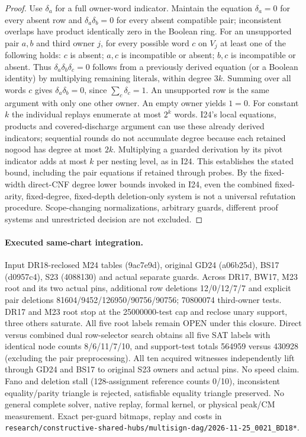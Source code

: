 \documentclass[11pt]{article}
\begin{document}
\begin{proof}
Use $\delta_a$ for a full owner-word indicator. Maintain the equation $\delta_a=0$ for every absent row and $\delta_a\delta_b=0$ for every absent compatible pair; inconsistent overlaps have product identically zero in the Boolean ring. For an unsupported pair $a,b$ and third owner $j$, for every possible word $c$ on $V_j$ at least one of the following holds: $c$ is absent; $a,c$ is incompatible or absent; $b,c$ is incompatible or absent. Thus $\delta_a\delta_b\delta_c=0$ follows from a previously derived equation (or a Boolean identity) by multiplying remaining literals, within degree $3k$. Summing over all words $c$ gives $\delta_a\delta_b=0$, since $\sum_c\delta_c=1$. An unsupported row is the same argument with only one other owner. An empty owner yields $1=0$. For constant $k$ the individual replays enumerate at most $2^k$ words. I24's local equations, products and covered-discharge argument can use these already derived indicators; sequential rounds do not accumulate degree because each retained nogood has degree at most $2k$. Multiplying a guarded derivation by its pivot indicator adds at most $k$ per nesting level, as in I24. This establishes the stated bound, including the pair equations if retained through probes. By the fixed-width direct-CNF degree lower bounds invoked in I24, even the combined fixed-arity, fixed-degree, fixed-depth deletion-only system is not a universal refutation procedure. Scope-changing normalizations, arbitrary guards, different proof systems and unrestricted decision are not excluded.
\end{proof}
\paragraph{Executed same-chart integration.} Input DR18-reclosed M24 tables (9ac7e9d), original GD24 (a06b25d), BS17 (d0957c4), S23 (4088130) and actual separate guards. Across DR17, BW17, M23 root and its two actual pins, additional row deletions 12/0/12/7/7 and explicit pair deletions 81604/9452/126950/90756/90756; 70800074 third-owner tests. DR17 and M23 root stop at the 25000000-test cap and reclose unary support, three others saturate. All five root labels remain OPEN under this closure. Direct versus combined dual row-selector search obtains all five SAT labels with identical node counts 8/6/11/7/10, and support-test totals 564959 versus 430928 (excluding the pair preprocessing). All ten acquired witnesses independently lift through GD24 and BS17 to original S23 owners and actual pins. No speed claim. Fano and deletion stall (128-assignment reference counts 0/10), inconsistent equality/parity triangle is rejected, satisfiable equality triangle preserved. No general complete solver, native replay, formal kernel, or physical peak/CM measurement. Exact per-guard bitmaps, replay and costs in \texttt{research/constructive-shared-hubs/multisign-dag/2026-11-25\_0021\_BD18*}.
\end{document}

